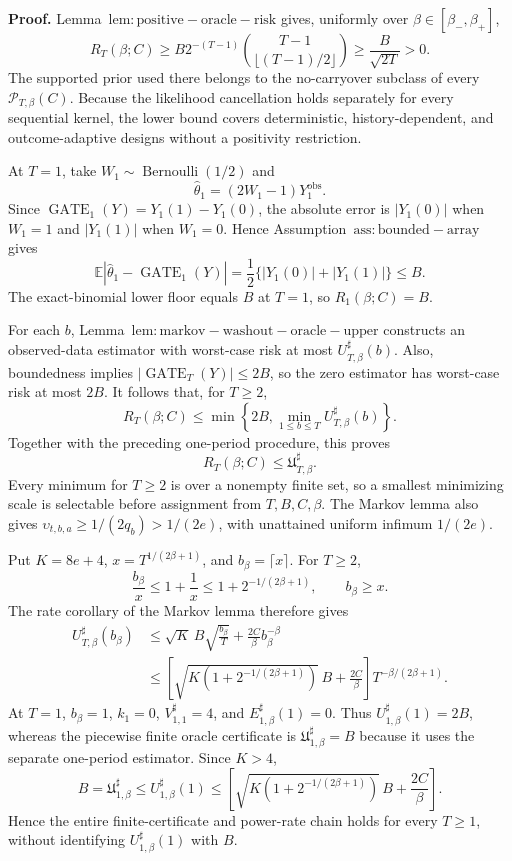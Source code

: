 \textbf{Proof.} Lemma~\(\mathrm{lem:positive-oracle-risk}\) gives, uniformly over \(\beta\in[\beta_-,\beta_+]\),
\[
R_T(\beta;C)
\ge B2^{-(T-1)}\binom{T-1}{\lfloor(T-1)/2\rfloor}
\ge\frac{B}{\sqrt{2T}}>0.
\]
The supported prior used there belongs to the no-carryover subclass of every \(\mathcal P_{T,\beta}(C)\). Because the likelihood cancellation holds separately for every sequential kernel, the lower bound covers deterministic, history-dependent, and outcome-adaptive designs without a positivity restriction.

At \(T=1\), take \(W_1\sim\operatorname{Bernoulli}(1/2)\) and
\[
\widehat\theta_1=(2W_1-1)Y_1^{\mathrm{obs}}.
\]
Since \(\operatorname{GATE}_1(Y)=Y_1(1)-Y_1(0)\), the absolute error is \(|Y_1(0)|\) when \(W_1=1\) and \(|Y_1(1)|\) when \(W_1=0\). Hence Assumption~\(\mathrm{ass:bounded-array}\) gives
\[
\mathbb E|\widehat\theta_1-\operatorname{GATE}_1(Y)|
=\frac12\{|Y_1(0)|+|Y_1(1)|\}\le B.
\]
The exact-binomial lower floor equals \(B\) at \(T=1\), so \(R_1(\beta;C)=B\).

For each \(b\), Lemma~\(\mathrm{lem:markov-washout-oracle-upper}\) constructs an observed-data estimator with worst-case risk at most \(U_{T,\beta}^{\sharp}(b)\). Also, boundedness implies \(|\operatorname{GATE}_T(Y)|\le2B\), so the zero estimator has worst-case risk at most \(2B\). It follows that, for \(T\ge2\),
\[
R_T(\beta;C)\le\min\left\{2B,\min_{1\le b\le T}U_{T,\beta}^{\sharp}(b)\right\}.
\]
Together with the preceding one-period procedure, this proves
\[
R_T(\beta;C)\le\mathfrak U_{T,\beta}^{\sharp}.
\]
Every minimum for \(T\ge2\) is over a nonempty finite set, so a smallest minimizing scale is selectable before assignment from \(T,B,C,\beta\). The Markov lemma also gives \(\upsilon_{t,b,a}\ge1/(2q_b)>1/(2e)\), with unattained uniform infimum \(1/(2e)\).

Put \(K=8e+4\), \(x=T^{1/(2\beta+1)}\), and \(b_\beta=\lceil x\rceil\). For \(T\ge2\),
\[
\frac{b_\beta}{x}\le1+\frac1x\le1+2^{-1/(2\beta+1)},
\qquad b_\beta\ge x.
\]
The rate corollary of the Markov lemma therefore gives
\[
\begin{aligned}
U_{T,\beta}^{\sharp}(b_\beta)
&\le \sqrt K\,B\sqrt{\frac{b_\beta}{T}}+\frac{2C}{\beta}b_\beta^{-\beta}\\
&\le\left[\sqrt{K\left(1+2^{-1/(2\beta+1)}\right)}\,B+\frac{2C}{\beta}\right]T^{-\beta/(2\beta+1)}.
\end{aligned}
\]
At \(T=1\), \(b_\beta=1\), \(k_1=0\), \(V_{1,1}^{\sharp}=4\), and \(E_{1,\beta}^{\sharp}(1)=0\). Thus \(U_{1,\beta}^{\sharp}(1)=2B\), whereas the piecewise finite oracle certificate is \(\mathfrak U_{1,\beta}^{\sharp}=B\) because it uses the separate one-period estimator. Since \(K>4\),
\[
B=\mathfrak U_{1,\beta}^{\sharp}\le U_{1,\beta}^{\sharp}(1)
\le\left[\sqrt{K\left(1+2^{-1/(2\beta+1)}\right)}\,B+\frac{2C}{\beta}\right].
\]
Hence the entire finite-certificate and power-rate chain holds for every \(T\ge1\), without identifying \(U_{1,\beta}^{\sharp}(1)\) with \(B\).

